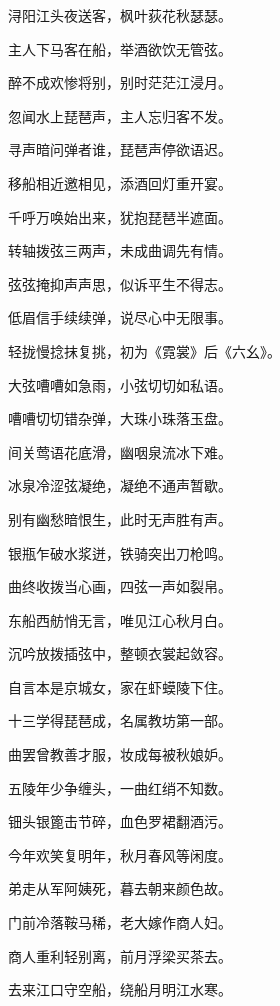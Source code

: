 \documentclass[12pt,UTF-8,openany,fontset=none]{ctexbook}
\begin{document}
\begin{center}
    \begin{Large}

        浔阳江头夜送客，枫叶荻花秋瑟瑟。

        主人下马客在船，举酒欲饮无管弦。

        醉不成欢惨将别，别时茫茫江浸月。

        忽闻水上琵琶声，主人忘归客不发。

        寻声暗问弹者谁，琵琶声停欲语迟。

        移船相近邀相见，添酒回灯重开宴。

        千呼万唤始出来，犹抱琵琶半遮面。

        转轴拨弦三两声，未成曲调先有情。

        弦弦掩抑声声思，似诉平生不得志。

        低眉信手续续弹，说尽心中无限事。

       \hspace{58pt} 轻拢慢捻抹复挑，初为《霓裳》后《六幺》。

        大弦嘈嘈如急雨，小弦切切如私语。

        嘈嘈切切错杂弹，大珠小珠落玉盘。

        间关莺语花底滑，幽咽泉流冰下难。

        冰泉冷涩弦凝绝，凝绝不通声暂歇。

        别有幽愁暗恨生，此时无声胜有声。

        银瓶乍破水浆迸，铁骑突出刀枪鸣。

        曲终收拨当心画，四弦一声如裂帛。

        东船西舫悄无言，唯见江心秋月白。

        沉吟放拨插弦中，整顿衣裳起敛容。

        自言本是京城女，家在虾蟆陵下住。

        十三学得琵琶成，名属教坊第一部。

        曲罢曾教善才服，妆成每被秋娘妒。

        五陵年少争缠头，一曲红绡不知数。

        钿头银篦击节碎，血色罗裙翻酒污。

        今年欢笑复明年，秋月春风等闲度。

        弟走从军阿姨死，暮去朝来颜色故。

        门前冷落鞍马稀，老大嫁作商人妇。

        商人重利轻别离，前月浮梁买茶去。

        去来江口守空船，绕船月明江水寒。


\end{Large}
\end{center}
\end{document}
